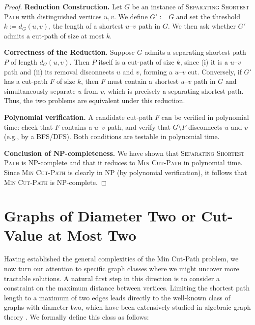 \documentclass[journal ]{new-aiaa}
\numberwithin{equation}{section}
\theoremstyle{definition}
\theoremstyle{plain}
\theoremstyle{remark}
\begin{document}
\begin{proof}
  

\textbf{Reduction Construction.}
Let $G$ be an instance of \textsc{Separating Shortest Path} with distinguished vertices $u,v$.  
We define $G' := G$ and set the threshold $k := d_G(u,v)$, the length of a shortest $u$--$v$ path in $G$.  
We then ask whether $G'$ admits a cut-path of size at most $k$.

\textbf{Correctness of the Reduction.}
Suppose $G$ admits a separating shortest path $P$ of length $d_G(u,v)$.  
Then $P$ itself is a cut-path of size $k$, since (i) it is a $u$--$v$ path and (ii) its removal disconnects $u$ and $v$, forming a $u$--$v$ cut.  
Conversely, if $G'$ has a cut-path $F$ of size $k$, then $F$ must contain a shortest $u$--$v$ path in $G$ and simultaneously separate $u$ from $v$, which is precisely a separating shortest path.  
Thus, the two problems are equivalent under this reduction.

\textbf{Polynomial verification.}  
A candidate cut-path $F$ can be verified in polynomial time:  
check that $F$ contains a $u$--$v$ path, and verify that $G\setminus F$ disconnects $u$ and $v$ (e.g., by a BFS/DFS).  
Both conditions are testable in polynomial time.

\textbf{Conclusion of NP-completeness.} 
We have shown that \textsc{Separating Shortest Path} is NP-complete and that it reduces to \textsc{Min Cut-Path} in polynomial time. Since \textsc{Min Cut-Path} is clearly in NP (by polynomial verification), it follows that \textsc{Min Cut-Path} is NP-complete.
  
\end{proof}

\section{Graphs of Diameter Two or Cut-Value at Most Two}
\label{sec:diameter_two}



Having established the general complexities of the Min Cut-Path problem, we now turn our attention to specific graph classes where we might uncover more tractable solutions. A natural first step in this direction is to consider a constraint on the maximum distance between vertices. Limiting the shortest path length to a maximum of two edges leads directly to the well-known class of graphs with diameter two, which have been extensively studied in algebraic graph theory \cite{GodsilRoyle2001}. We formally define this class as follows:
\end{document}
